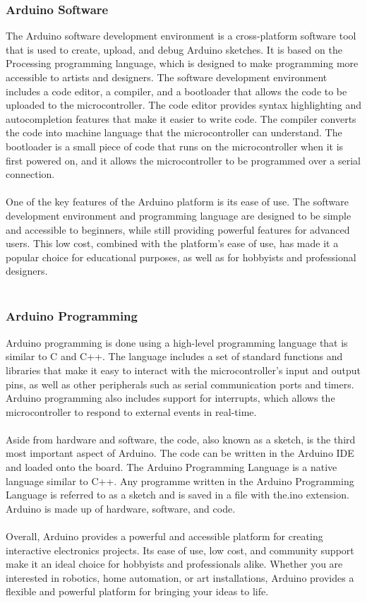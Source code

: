\documentclass[12pt]{article}
\begin{document}
\subsubsection{Arduino Software}
The Arduino software development environment is a cross-platform software tool that is used to create, upload, and debug Arduino sketches. It is based on the Processing programming language, which is designed to make programming more accessible to artists and designers. The software development environment includes a code editor, a compiler, and a bootloader that allows the code to be uploaded to the microcontroller. The code editor provides syntax highlighting and autocompletion features that make it easier to write code. The compiler converts the code into machine language that the microcontroller can understand. The bootloader is a small piece of code that runs on the microcontroller when it is first powered on, and it allows the microcontroller to be programmed over a serial connection.
\\
\\
One of the key features of the Arduino platform is its ease of use. The software development environment and programming language are designed to be simple and accessible to beginners, while still providing powerful features for advanced users. This low cost, combined with the platform's ease of use, has made it a popular choice for educational purposes, as well as for hobbyists and professional designers.
 \\
 \\
\subsubsection{Arduino Programming}
Arduino programming is done using a high-level programming language that is similar to C and C++. The language includes a set of standard functions and libraries that make it easy to interact with the microcontroller's input and output pins, as well as other peripherals such as serial communication ports and timers. Arduino programming also includes support for interrupts, which allows the microcontroller to respond to external events in real-time.
\\
\\
Aside from hardware and software, the code, also known as a sketch, is the third most important aspect of Arduino. The code can be written in the Arduino IDE and loaded onto the board. The Arduino Programming Language is a native language similar to C++. Any programme written in the Arduino Programming Language is referred to as a sketch and is saved in a file with the.ino extension.
Arduino is made up of hardware, software, and code.
\\
\\
Overall, Arduino provides a powerful and accessible platform for creating interactive electronics projects. Its ease of use, low cost, and community support make it an ideal choice for hobbyists and professionals alike. Whether you are interested in robotics, home automation, or art installations, Arduino provides a flexible and powerful platform for bringing your ideas to life.
\\
\\
\end{document}
